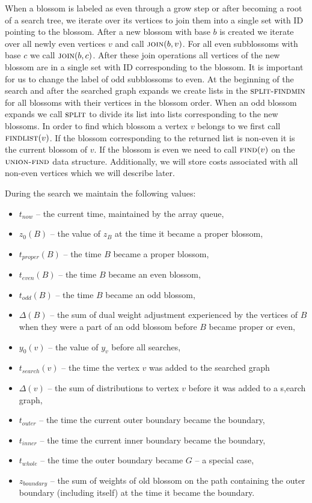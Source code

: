 When a blossom is labeled as even through a grow step or after becoming a root of a search tree, we iterate over its vertices to join them into a single set with ID pointing to the blossom. After a new blossom with base $b$ is created we iterate over all newly even vertices $v$ and call $\textsc{join}(b, v)$. For all even subblossoms with base $c$ we call $\textsc{join}(b, c)$. After these join operations all vertices of the new blossom are in a single set with ID corresponding to the blossom. It is important for us to change the label of odd subblossoms to even. At the beginning of the search and after the searched graph expands we create lists in the $\textsc{split-findmin}$ for all blossoms with their vertices in the blossom order. When an odd blossom expands we call $\textsc{split}$ to divide its list into lists corresponding to the new blossoms. In order to find which blossom a vertex $v$ belongs to we first call $\textsc{findlist}(v)$. If the blossom corresponding to the returned list is non-even it is the current blossom of $v$. If the blossom is even we need to call $\textsc{find}(v)$ on the $\textsc{union-find}$ data structure. Additionally, we will store costs associated with all non-even vertices which we will describe later.

During the search we maintain the following values:

\begin{itemize}
    \item $t_{now}$ – the current time, maintained by the array queue,
    \item $z_0(B)$ – the value of $z_B$ at the time it became a proper blossom,
    \item $t_{proper}(B)$ – the time $B$ became a proper blossom,
    \item $t_{even}(B)$ – the time $B$ became an even blossom,
    \item $t_{odd}(B)$ – the time $B$ became an odd blossom,
    \item $\Delta(B)$ – the sum of dual weight adjustment experienced by the vertices of $B$ when they were a part of an odd blossom before $B$ became proper or even,
    \item $y_0(v)$ – the value of $y_v$ before all searches,
    \item $t_{search}(v)$ – the time the vertex $v$ was added to the searched graph
    \item $\Delta(v)$ – the sum of distributions to vertex $v$ before it was added to a s,earch graph,
    \item $t_{outer}$ – the time the current outer boundary became the boundary,
    \item $t_{inner}$ – the time the current inner boundary became the boundary,
    \item $t_{whole}$ – the time the outer boundary became $G$ – a special case,
    \item $z_{boundary}$ – the sum of weights of old blossom on the path containing the outer boundary (including itself) at the time it became the boundary.
\end{itemize}


